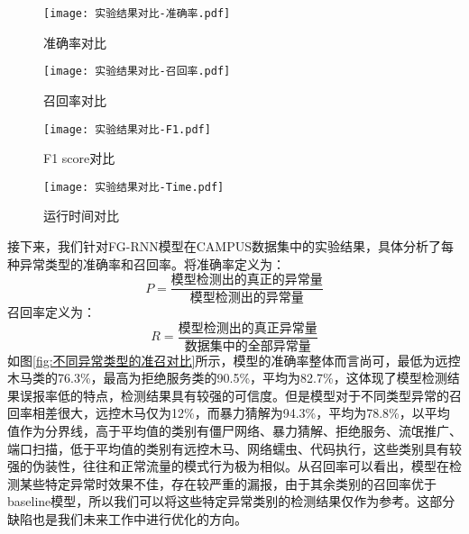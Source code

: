   \begin{figure}[htbp]
    \centering
    \begin{minipage}[t]{0.48\textwidth}
    \centering
    \texttt{[image: 实验结果对比-准确率.pdf]}
    \caption{准确率对比}
    \end{minipage}
    \begin{minipage}[t]{0.48\textwidth}
    \centering
    \texttt{[image: 实验结果对比-召回率.pdf]}
    \caption{召回率对比}
    \end{minipage}
    \end{figure}

    \begin{figure}[htbp]
      \centering
      \begin{minipage}[t]{0.48\textwidth}
      \centering
      \texttt{[image: 实验结果对比-F1.pdf]}
      \caption{F1 score对比}
      \end{minipage}
      \begin{minipage}[t]{0.48\textwidth}
      \centering
      \texttt{[image: 实验结果对比-Time.pdf]}
      \caption{运行时间对比}
      \end{minipage}
      \end{figure}

接下来，我们针对FG-RNN模型在CAMPUS数据集中的实验结果，具体分析了每种异常类型的准确率和召回率。将准确率定义为：
\begin{equation}
  P = \frac{\mbox{模型检测出的真正的异常量}}{\mbox{模型检测出的异常量}}
\end{equation}
召回率定义为：
\begin{equation}
  R = \frac{\mbox{模型检测出的真正异常量}}{\mbox{数据集中的全部异常量}}
\end{equation}
如图\ref{fig:不同异常类型的准召对比}所示，模型的准确率整体而言尚可，最低为远控木马类的76.3\%，最高为拒绝服务类的90.5\%，平均为82.7\%，这体现了模型检测结果误报率低的特点，检测结果具有较强的可信度。但是模型对于不同类型异常的召回率相差很大，远控木马仅为12\%，而暴力猜解为94.3\%，平均为78.8\%，以平均值作为分界线，高于平均值的类别有僵尸网络、暴力猜解、拒绝服务、流氓推广、端口扫描，低于平均值的类别有远控木马、网络蠕虫、代码执行，这些类别具有较强的伪装性，往往和正常流量的模式行为极为相似。从召回率可以看出，模型在检测某些特定异常时效果不佳，存在较严重的漏报，由于其余类别的召回率优于baseline模型，所以我们可以将这些特定异常类别的检测结果仅作为参考。这部分缺陷也是我们未来工作中进行优化的方向。

